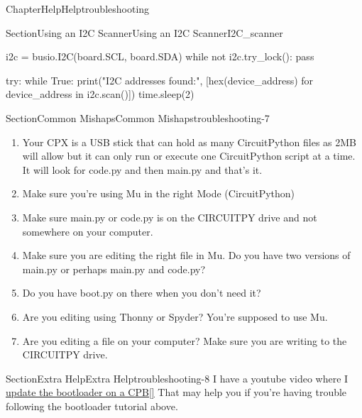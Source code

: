 \documentclass[oneside,10pt,]{book}
\newcommand{\xreffont}{\relax}
\newcommand{\linkhilite}[1]{\underline{#1}}
\numberwithin{equation}{section}
\begin{document}
\begin{chapterptx}{Chapter}{Help}{}{Help}{}{}{troubleshooting}
\begin{sectionptx}{Section}{Using an I2C Scanner}{}{Using an I2C Scanner}{}{}{I2C_scanner}
\begin{preformatted}
i2c = busio.I2C(board.SCL, board.SDA)
while not i2c.try_lock():
    pass

try:
  while True:
      print("I2C addresses found:", [hex(device_address) for device_address in i2c.scan()])
  time.sleep(2)
\end{preformatted}
\end{sectionptx}
%
%
\typeout{************************************************}
\typeout{************************************************}
%
\begin{sectionptx}{Section}{Common Mishaps}{}{Common Mishaps}{}{}{troubleshooting-7}
%
\begin{enumerate}
\item{}Your CPX is a USB stick that can hold as many CircuitPython files as 2MB will allow but it can only run or execute one CircuitPython script at a time. It will look for code.py and then main.py and that's it.%
\item{}Make sure you're using Mu in the right Mode (CircuitPython)%
\item{}Make sure main.py or code.py is on the CIRCUITPY drive and not somewhere on your computer.%
\item{}Make sure you are editing the right file in Mu. Do you have two versions of main.py or perhaps main.py and code.py?%
\item{}Do you have boot.py on there when you don't need it?%
\item{}Are you editing using Thonny or Spyder? You're supposed to use Mu.%
\item{}Are you editing a file on your computer? Make sure you are writing to the CIRCUITPY drive.%
\end{enumerate}
\end{sectionptx}
%
%
\typeout{************************************************}
\typeout{************************************************}
%
\begin{sectionptx}{Section}{Extra Help}{}{Extra Help}{}{}{troubleshooting-8}
I have a youtube video where I \href{https://www.youtube.com/watch?v=xVMPgU5z9gE}{\linkhilite{update the bootloader on a CPB}}\hyperlink{youtube}{\linkhilite{[{\xreffont 50}]}} That may help you if you're having trouble following the bootloader tutorial above.%
\end{sectionptx}
\end{chapterptx}
%
%
\typeout{************************************************}
\end{document}
